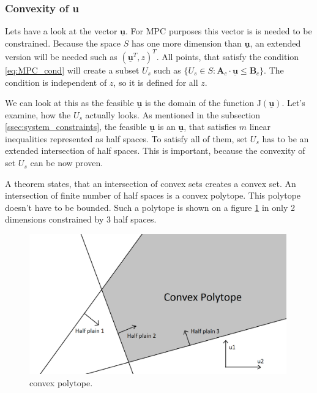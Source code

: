 \documentclass{article}
\begin{document}
\subsubsection{Convexity of u}
Lets have a look at the vector $\underline{\textbf{u}}$. For MPC purposes this vector is is needed to be constrained. Because the space $S$ has one more dimension than $\underline{\textbf{u}}$, an extended version will be needed such as $(\underline{\textbf{u}}^T, z)^T$.
All points, that satisfy the condition \ref{eq:MPC_cond} will create a subset $U_s$ such as $\{U_s \in S : \textbf{A}_c \cdot \underline{\textbf{u}} \leq \textbf{B}_c\}$. The condition is independent of $z$, so it is defined for all $z$. 

We can look at this as the feasible $\underline{\textbf{u}}$ is the domain of the function $\mathrm{J}(\underline{\textbf{u}})$. Let's examine, how the $U_s$ actually looks. As mentioned in the subsection \ref{ssec:system_constraints}, the feasible $\underline{\textbf{u}}$ is an $\underline{\textbf{u}}$, that satisfies $m$ linear inequalities represented as half spaces. To satisfy all of them, set $U_s$ has to be an extended intersection of half spaces. This is important, because the convexity of set $U_s$ can be now proven. 

A theorem states, that an intersection of convex sets creates a convex set. An intersection of finite number of half spaces is a convex polytope. This polytope doesn't have to be bounded. Such a polytope is shown on a figure \ref{fig:convex_polytope} in only 2 dimensions constrained by 3 half spaces.

\begin{figure}[h]
\includegraphics[width=0.99\textwidth]{fig/convex_polytope} 
\caption{convex polytope.}
\label{fig:convex_polytope}
\end{figure}
\end{document}
